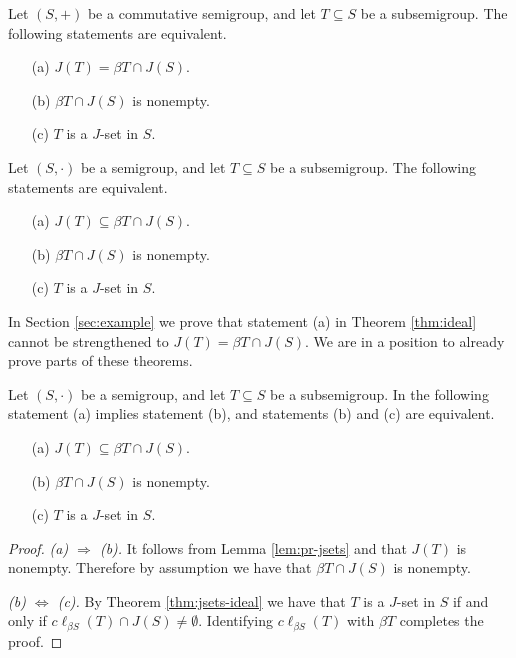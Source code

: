 \begin{thm}
  \label{thm:comm-case}
  Let $(S, +)$ be a commutative semigroup, and let $T \subseteq S$ be a subsemigroup.
  The following statements are equivalent.
  \begin{itemize}
    \item[(a)]
      $J(T) = \beta T \cap J(S)$.

    \item[(b)]
      $\beta T \cap J(S)$ is nonempty.

    \item[(c)]
      $T$ is a $J$-set in $S$. 
  \end{itemize}
\end{thm}

\begin{thm}
  \label{thm:ideal}
  Let $(S, \cdot)$ be a semigroup, and let $T \subseteq S$ be a subsemigroup.
  The following statements are equivalent.
  \begin{itemize}
    \item[(a)]
      $J(T) \subseteq \beta T \cap J(S)$.

    \item[(b)]
      $\beta T \cap J(S)$ is nonempty.

    \item[(c)]
      $T$ is a $J$-set in $S$. 
  \end{itemize}
\end{thm}

In Section \ref{sec:example} we prove that statement (a) in Theorem \ref{thm:ideal} cannot be strengthened to $J(T) = \beta T \cap J(S)$. 
We are in a position to already prove parts of these theorems.

\begin{thm}
  Let $(S, \cdot)$ be a semigroup, and let $T \subseteq S$ be a subsemigroup.
  In the following statement (a) implies statement (b), and statements (b) and (c) are equivalent.
  \begin{itemize}
    \item[(a)]
      $J(T) \subseteq \beta T \cap J(S)$.

    \item[(b)]
      $\beta T \cap J(S)$ is nonempty.

    \item[(c)]
      $T$ is a $J$-set in $S$. 
  \end{itemize}
\end{thm}
\begin{proof}
  \textsl{(a) $\Rightarrow$ (b).}
  It follows from Lemma \ref{lem:pr-jsets} and \cite[Theorem 3.11]{Hindman:1998fk} that $J(T)$ is nonempty. 
  Therefore by assumption we have that $\beta T \cap J(S)$ is nonempty. 

  \textsl{(b) $\iff$ (c).}
  By Theorem \ref{thm:jsets-ideal} we have that $T$ is a $J$-set in $S$ if and only if $c \ell_{\beta S} (T) \cap J(S) \ne \emptyset$. 
  Identifying $c \ell_{\beta S}(T)$ with $\beta T$ completes the proof.
\end{proof}


